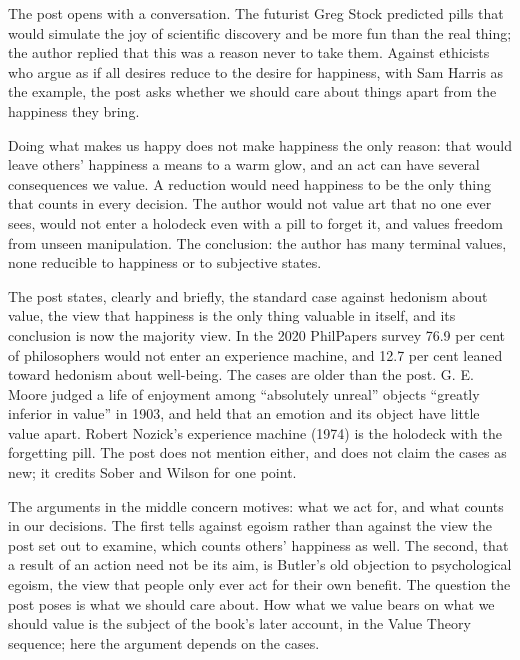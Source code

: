 \begin{afterword}
\summaryhead

The post opens with a conversation. The futurist Greg Stock predicted pills that would simulate the joy of scientific discovery and be more fun than the real thing; the author replied that this was a reason never to take them. Against ethicists who argue as if all desires reduce to the desire for happiness, with Sam Harris as the example, the post asks whether we should care about things apart from the happiness they bring.

Doing what makes us happy does not make happiness the only reason: that would leave others' happiness a means to a warm glow, and an act can have several consequences we value. A reduction would need happiness to be the only thing that counts in every decision. The author would not value art that no one ever sees, would not enter a holodeck even with a pill to forget it, and values freedom from unseen manipulation. The conclusion: the author has many terminal values, none reducible to happiness or to subjective states.

\responsehead

The post states, clearly and briefly, the standard case against hedonism about value, the view that happiness is the only thing valuable in itself, and its conclusion is now the majority view. In the 2020 PhilPapers survey 76.9 per cent of philosophers would not enter an experience machine, and 12.7 per cent leaned toward hedonism about well-being. The cases are older than the post. G. E. Moore judged a life of enjoyment among ``absolutely unreal'' objects ``greatly inferior in value'' in 1903, and held that an emotion and its object have little value apart. Robert Nozick's experience machine (1974) is the holodeck with the forgetting pill. The post does not mention either, and does not claim the cases as new; it credits Sober and Wilson for one point.

The arguments in the middle concern motives: what we act for, and what counts in our decisions. The first tells against egoism rather than against the view the post set out to examine, which counts others' happiness as well. The second, that a result of an action need not be its aim, is Butler's old objection to psychological egoism, the view that people only ever act for their own benefit. The question the post poses is what we should care about. How what we value bears on what we should value is the subject of the book's later account, in the Value Theory sequence; here the argument depends on the cases.


\end{afterword}
